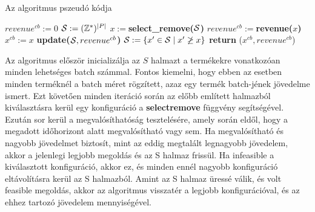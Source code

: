 \begin{algorithm}[H]
\caption{Az algoritmus pszeudó kódja}
\label{throughput}
\begin{algorithmic}[1]
  \State $revenue^{cb}:=  0$
  \State ${\cal S}:=  (\mathbb{Z}^*)^{|P|}$
    \State $x:= $\textbf{select\_remove(}$\cal S$\textbf{)}
        \State $revenue^{cb}:= $\textbf{revenue(}$x$\textbf{)}
        \State $x^{cb}:=  x$
        \State \textbf{update(}${\cal S},revenue^{cb}$\textbf{)}
      \EndIf
    \Else
      \State ${\cal S}:= \{ x'\in{\cal S} \mid x' \not\ge x\}$
    \EndIf
  \EndWhile
    \State \textbf{return} ($x^{cb},revenue^{cb}$)
  \EndIf
\end{algorithmic}
\end{algorithm}

Az algoritmus először inicializálja az $S$ halmazt a termékekre vonatkozóan minden lehetséges batch számmal. Fontos kiemelni, hogy ebben az esetben minden terméknél a batch méret rögzített, azaz egy termék batch-jének jövedelme ismert. Ezt követően minden iteráció során az előbb említett halmazból kiválasztásra kerül egy konfiguráció a \textbf{select\textunderscore remove} függvény segítségével. Ezután sor kerül a megvalósíthatóság tesztelésére, amely során eldől, hogy a megadott időhorizont alatt megvalósítható vagy sem. Ha megvalósítható és nagyobb jövedelmet biztosít, mint az eddig megtalált legnagyobb jövedelem, akkor a jelenlegi legjobb megoldás és az S halmaz frissül. Ha infeasible a kiválasztott konfiguráció, akkor ez, és minden ennél nagyobb konfiguráció eltávolításra kerül az S halmazból. Amint az S halmaz üressé válik, és volt feasible megoldás, akkor az algoritmus visszatér a legjobb konfigurációval, és az ehhez tartozó jövedelem mennyiségével.

